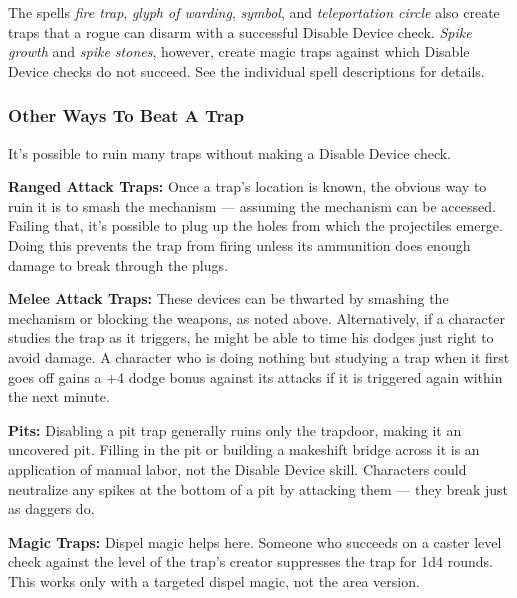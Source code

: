The spells \emph{fire trap}, \emph{glyph of warding}, \emph{symbol}, and \emph{teleportation circle} also create traps that a rogue can disarm with a successful Disable Device check. \emph{Spike growth} and \emph{spike stones}, however, create magic traps against which Disable Device checks do not succeed. See the individual spell descriptions for details.

\subsubsection{Other Ways To Beat A Trap}
It’s possible to ruin many traps without making a Disable Device check.

\textbf{Ranged Attack Traps:} Once a trap’s location is known, the obvious way to ruin it is to smash the mechanism --- assuming the mechanism can be accessed. Failing that, it’s possible to plug up the holes from which the projectiles emerge. Doing this prevents the trap from firing unless its ammunition does enough damage to break through the plugs.

\textbf{Melee Attack Traps:} These devices can be thwarted by smashing the mechanism or blocking the weapons, as noted above. Alternatively, if a character studies the trap as it triggers, he might be able to time his dodges just right to avoid damage. A character who is doing nothing but studying a trap when it first goes off gains a +4 dodge bonus against its attacks if it is triggered again within the next minute.

\textbf{Pits:} Disabling a pit trap generally ruins only the trapdoor, making it an uncovered pit. Filling in the pit or building a makeshift bridge across it is an application of manual labor, not the Disable Device skill. Characters could neutralize any spikes at the bottom of a pit by attacking them --- they break just as daggers do.

\textbf{Magic Traps:} Dispel magic helps here. Someone who succeeds on a caster level check against the level of the trap’s creator suppresses the trap for 1d4 rounds. This works only with a targeted dispel magic, not the area version.